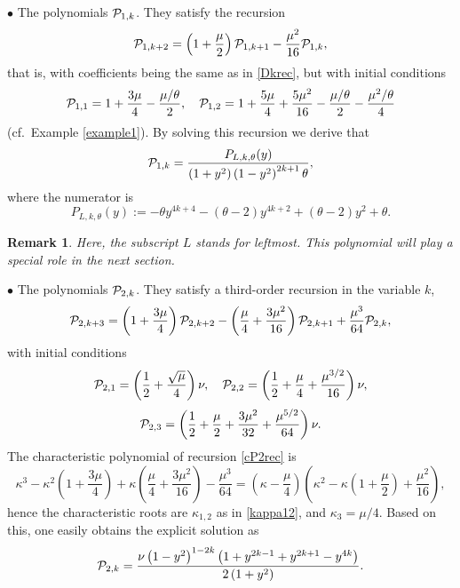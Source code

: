 \documentclass[a4paper]{article}
\newtheorem{remark}{Remark}
\newcommand{\te}{\theta}
\newcommand{\Pol}{P_{L,k,\te}(y)}
\newcommand{\cP}{{\cal{P}}}
\begin{document}
$\bullet$  The polynomials $\cP_{1,k}$. They satisfy the recursion 
\[
\cP_{1,k+2}=\left(1+\frac{\mu}{2}\right)\cP_{1,k+1}-\frac{\mu^2}{16}\cP_{1,k},
\]
that is, with coefficients being the same as in \eqref{Dkrec}, but with initial conditions
\[
\cP_{1,1}=1+\frac{3 \mu }{4}-\frac{\mu /\theta}{2  }, \quad \cP_{1,2}=1+\frac{5 \mu }{4}+\frac{5 \mu ^2}{16}-\frac{\mu/\theta }{2  }-\frac{\mu ^2/\theta}{4  }
\]
(cf.~Example \ref{example1}). By solving this recursion we derive that
\[
\cP_{1,k}=\frac{\Pol}{  \left(1+y^2\right)\left(1-y^2\right)^{2 k+1}\theta},
\] 
where the numerator is 
\[\Pol:=-\theta  y^{4 k+4}-(\theta -2) y^{4 k+2}+(\theta -2) y^2+\theta.\]
\begin{remark}
Here, the subscript $L$ stands for \emph{leftmost}. This polynomial will play a special role in the next section.
\end{remark}


$\bullet$  The polynomials $\cP_{2,k}$. They satisfy a third-order recursion in the variable $k$,
\begin{equation}\label{cP2rec}
\cP_{2,k+3}=\left(1+\frac{3\mu}{4}\right)\cP_{2,k+2}-\left(\frac{\mu }{4}+\frac{3 \mu ^2}{16}\right)\cP_{2,k+1}+\frac{\mu ^3}{64}\cP_{2,k},
\end{equation}
with initial conditions 
\[
\cP_{2,1}=\left(\frac{1}{2}+\frac{\sqrt{\mu }}{4}\right) \nu, \quad \cP_{2,2}=\left(\frac{1}{2}+\frac{\mu }{4}+\frac{\mu ^{3/2}}{16}\right) \nu,
\]
\[
\cP_{2,3}=\left(\frac{1}{2}+\frac{\mu }{2}+\frac{3 \mu ^2}{32}+\frac{\mu ^{5/2}}{64}\right) \nu.
\]
The  characteristic polynomial of recursion \eqref{cP2rec} is 
\[
\kappa ^3-\kappa ^2 \left(1+\frac{3 \mu }{4}\right)+\kappa  \left(\frac{\mu }{4}+\frac{3 \mu ^2}{16}\right)-\frac{\mu ^3}{64}=\left(\kappa-\frac{\mu }{4}\right)\left(\kappa ^2-\kappa  \left(1+\frac{\mu }{2}\right)+\frac{\mu ^2}{16}\right),
\]
hence the characteristic roots are $\kappa_{1,2}$ as in \eqref{kappa12}, and $\kappa_3={\mu }/{4}$. Based on this, one easily obtains the explicit solution as
\begin{equation}\label{cP2kexpl}
\cP_{2,k}=\frac{\nu  \left(1-y^2\right)^{1-2 k} \left(1+y^{2 k-1}+y^{2 k+1}-y^{4 k}\right)}{2 \left(1+y^2\right)}.
\end{equation}
\end{document}
